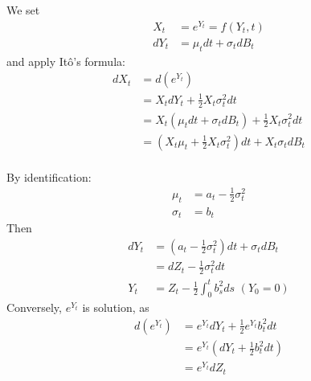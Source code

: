 {
We set
\begin{align*}
    X_t &= e^{Y_t} = f(Y_t,t) \\
    dY_t &= \mu_t dt + \sigma_t dB_t
\end{align*}
and apply Itô's formula:
\begin{align*}
    dX_t &= d(e^{Y_t}) \\
    &= X_t dY_t + \frac{1}{2}X_t \sigma_t^2dt \\
    &= X_t \left( \mu_t dt + \sigma_t dB_t \right) + \frac{1}{2}X_t \sigma_t^2dt \\
    &= \left( X_t \mu_t + \frac{1}{2}X_t \sigma_t^2\right) dt + X_t \sigma_t dB_t \\
\end{align*}

By identification:
\begin{align*}
    \mu_t &= a_t - \frac{1}{2}\sigma_t^2 \\
    \sigma_t &= b_t
\end{align*}
Then
\begin{align*}
    dY_t &= \left( a_t - \frac{1}{2}\sigma_t^2\right) dt + \sigma_t dB_t \\
    &= dZ_t - \frac{1}{2}\sigma^2_t dt \\
    Y_t &= Z_t - \frac{1}{2} \int_0^t b_s^2 ds \,\, (Y_0 = 0)
\end{align*}
Conversely, $e^{Y_t}$ is solution, as
\begin{align*}
    d(e^{Y_t}) &= e^{Y_t} dY_t + \frac{1}{2}e^{Y_t} b_t^2 dt \\
    &= e^{Y_t} \left( dY_t + \frac{1}{2}b_t^2 dt\right) \\
    &= e^{Y_t} dZ_t
\end{align*}
}

